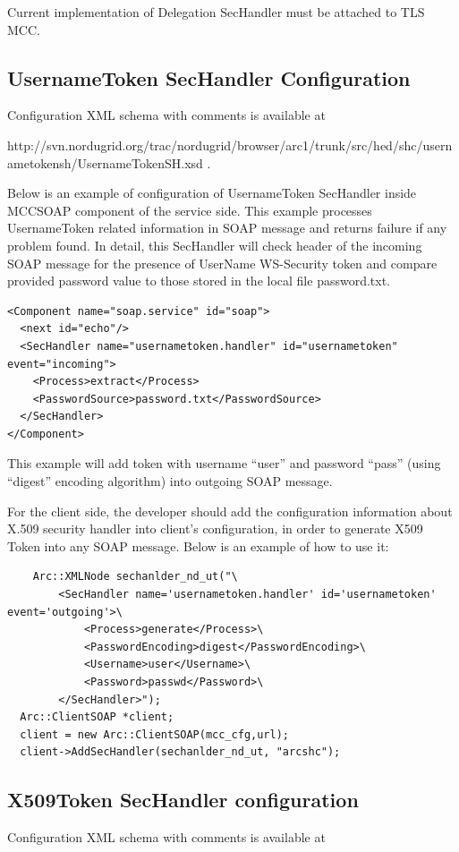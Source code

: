 \documentclass{article}                            %
\begin{document}
Current implementation of Delegation SecHandler must be attached to TLS MCC. 


\subsection{UsernameToken SecHandler Configuration} %
\label{subsec:ut_sechandler_conf}
Configuration XML schema with comments is available at 

http://svn.nordugrid.org/trac/nordugrid/browser/arc1/trunk/src/hed/shc/usernametokensh/UsernameTokenSH.xsd .

Below is an example of configuration of UsernameToken SecHandler inside MCCSOAP component of the service side. This example processes UsernameToken related information in SOAP message and returns failure if any problem found. In detail, this SecHandler will check header of the incoming SOAP message for the presence of UserName WS-Security token and compare provided password value to those stored in the local file password.txt.

\begin{verbatim}
<Component name="soap.service" id="soap">
  <next id="echo"/>
  <SecHandler name="usernametoken.handler" id="usernametoken" event="incoming">
    <Process>extract</Process>
    <PasswordSource>password.txt</PasswordSource>
  </SecHandler>
</Component>
\end{verbatim}

This example will add token with username ``user'' and password ``pass'' (using ``digest'' encoding algorithm) into outgoing SOAP message.

For the client side, the developer should add the configuration information about X.509 security handler into client's configuration, in order to generate X509 Token into any SOAP message. Below is an example of how to use it:

\begin{verbatim}
    Arc::XMLNode sechanlder_nd_ut("\ 
        <SecHandler name='usernametoken.handler' id='usernametoken' event='outgoing'>\ 
            <Process>generate</Process>\ 
            <PasswordEncoding>digest</PasswordEncoding>\ 
            <Username>user</Username>\ 
            <Password>passwd</Password>\ 
        </SecHandler>"); 
  Arc::ClientSOAP *client; 
  client = new Arc::ClientSOAP(mcc_cfg,url); 
  client->AddSecHandler(sechanlder_nd_ut, "arcshc");
\end{verbatim}

\subsection{X509Token SecHandler configuration} %
\label{subsec:xt_sechandler_conf}
Configuration XML schema with comments is available at 
\end{document}
